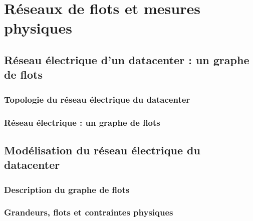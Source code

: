 
\chapter{R\'eseaux de flots et mesures physiques}
\label{ReseauFlotsMesures}
	

	\section{R\'eseau \'electrique d'un datacenter : un graphe de flots}
		\subsection{Topologie du r\'eseau \'electrique du datacenter}
			
		\subsection{R\'eseau \'electrique : un graphe de flots}
			
		
		
	\section{Mod\'elisation du r\'eseau \'electrique du datacenter}
		\subsection{Description du graphe de flots}
			
		\subsection{Grandeurs, flots et contraintes physiques}
			

